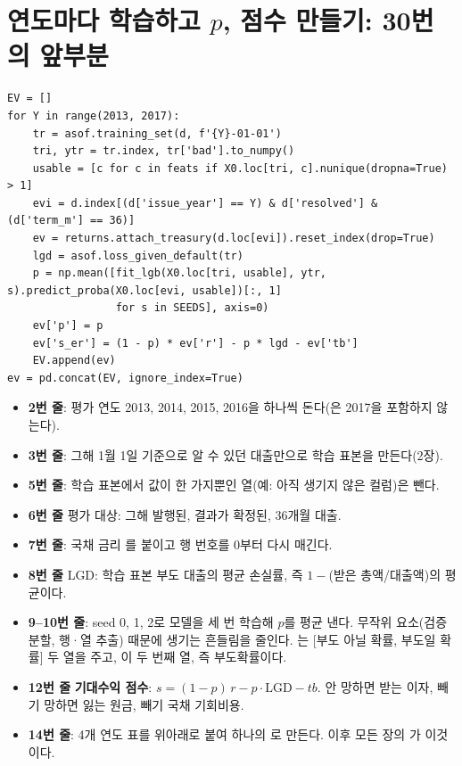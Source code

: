 \section{연도마다 학습하고 $p$, 점수 만들기: 30번의 앞부분}
\begin{lstlisting}
EV = []
for Y in range(2013, 2017):
    tr = asof.training_set(d, f'{Y}-01-01')
    tri, ytr = tr.index, tr['bad'].to_numpy()
    usable = [c for c in feats if X0.loc[tri, c].nunique(dropna=True) > 1]
    evi = d.index[(d['issue_year'] == Y) & d['resolved'] & (d['term_m'] == 36)]
    ev = returns.attach_treasury(d.loc[evi]).reset_index(drop=True)
    lgd = asof.loss_given_default(tr)
    p = np.mean([fit_lgb(X0.loc[tri, usable], ytr, s).predict_proba(X0.loc[evi, usable])[:, 1]
                 for s in SEEDS], axis=0)
    ev['p'] = p
    ev['s_er'] = (1 - p) * ev['r'] - p * lgd - ev['tb']
    EV.append(ev)
ev = pd.concat(EV, ignore_index=True)
\end{lstlisting}
\begin{itemize}[leftmargin=*]
\item \textbf{2번 줄}: 평가 연도 2013, 2014, 2015, 2016을 하나씩 돈다(은 2017을 포함하지 않는다).
\item \textbf{3번 줄}: 그해 1월 1일 기준으로 알 수 있던 대출만으로 학습 표본을 만든다(2장).
\item \textbf{5번 줄}: 학습 표본에서 값이 한 가지뿐인 열(예: 아직 생기지 않은 컬럼)은 뺀다.
\item \textbf{6번 줄} 평가 대상: 그해 발행된, 결과가 확정된, 36개월 대출.
\item \textbf{7번 줄}: 국채 금리 를 붙이고 행 번호를 0부터 다시 매긴다.
\item \textbf{8번 줄} LGD: 학습 표본 부도 대출의 평균 손실률, 즉 $1-$(받은 총액/대출액)의 평균이다.
\item \textbf{9--10번 줄}: seed 0, 1, 2로 모델을 세 번 학습해 $p$를 평균 낸다. 무작위 요소(검증 분할, 행·\allowbreak{}열 추출) 때문에 생기는 흔들림을 줄인다. 는 [부도 아닐 확률, 부도일 확률] 두 열을 주고, \ft{[:, 1]}이 두 번째 열, 즉 부도확률이다.
\item \textbf{12번 줄} \textbf{기대수익 점수}: $s=(1-p)\,r-p\cdot\mathrm{LGD}-tb$. 안 망하면 받는 이자, 빼기 망하면 잃는 원금, 빼기 국채 기회비용.
\item \textbf{14번 줄}: 4개 연도 표를 위아래로 붙여 하나의 로 만든다. 이후 모든 장의 가 이것이다.
\end{itemize}

